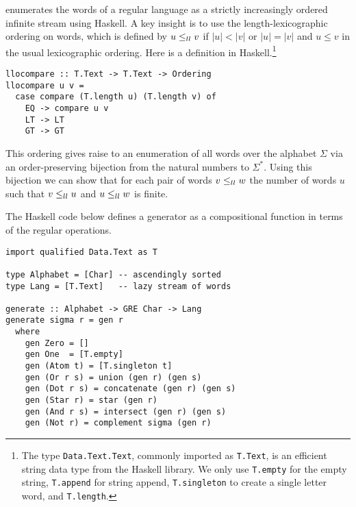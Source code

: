 \citet{DBLP:journals/jfp/McIlroy99} enumerates the words of a regular language as a
strictly increasingly ordered infinite stream using Haskell. A key insight is to use the
length-lexicographic ordering on words, which is defined by $u \le_{ll} v$ if $|u|<|v|$ or
$|u|=|v|$ and $u\le v$ in the usual lexicographic ordering. Here is a definition in Haskell.\footnote{The type
  \lstinline{Data.Text.Text}, commonly imported as \lstinline{T.Text}, is an efficient
  string data type from the Haskell library. We only use \lstinline{T.empty} for the empty
  string, \lstinline{T.append} for string append, \lstinline{T.singleton} to create a
  single letter word, and \lstinline{T.length}.}
\begin{lstlisting}
llocompare :: T.Text -> T.Text -> Ordering
llocompare u v =
  case compare (T.length u) (T.length v) of
    EQ -> compare u v
    LT -> LT
    GT -> GT
\end{lstlisting}
This ordering gives raise to an
enumeration of all words over the alphabet $\Sigma$ via an order-preserving
bijection from the natural numbers to $\Sigma^*$. Using this
bijection we can show that for each pair of words $v \le_{ll} w$ the
number of words $u$ such that $v \le_{ll} u$ and $u \le_{ll} w$ is finite. 


The Haskell code below defines a generator as a compositional function in terms of
the regular operations. 
\begin{lstlisting}
import qualified Data.Text as T

type Alphabet = [Char] -- ascendingly sorted
type Lang = [T.Text]   -- lazy stream of words

generate :: Alphabet -> GRE Char -> Lang
generate sigma r = gen r
  where
    gen Zero = []
    gen One  = [T.empty]
    gen (Atom t) = [T.singleton t]
    gen (Or r s) = union (gen r) (gen s)
    gen (Dot r s) = concatenate (gen r) (gen s)
    gen (Star r) = star (gen r)
    gen (And r s) = intersect (gen r) (gen s)
    gen (Not r) = complement sigma (gen r)
\end{lstlisting}

